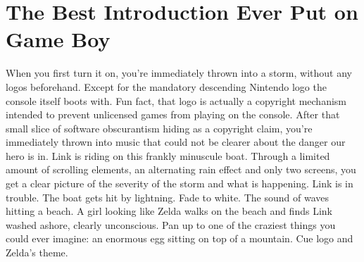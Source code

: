 \documentclass{book}
\begin{document}
\FloatBarrier\section*{The Best Introduction Ever Put on Game Boy}
When you first turn it on, you’re immediately thrown into a storm, without any logos beforehand. Except for the mandatory descending Nintendo logo the console itself boots with. Fun fact, that logo is actually a copyright mechanism intended to prevent unlicensed games from playing on the console. After that small slice of software obscurantism hiding as a copyright claim, you’re immediately thrown into music that could not be clearer about the danger our hero is in. Link is riding on this frankly minuscule boat. Through a limited amount of scrolling elements, an alternating rain effect and only two screens, you get a clear picture of the severity of the storm and what is happening. Link is in trouble. The boat gets hit by lightning. Fade to white. The sound of waves hitting a beach. A girl looking like Zelda walks on the beach and finds Link washed ashore, clearly unconscious. Pan up to one of the craziest things you could ever imagine: an enormous egg sitting on top of a mountain. Cue logo and Zelda’s theme.\par
\end{document}
